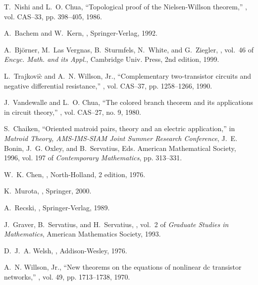 \documentclass{article}
\begin{document}
\begin{thebibliography}{10}
T.~Nishi and L.~O. Chua,
\newblock ``Topological proof of the {N}ielsen-{W}illson theorem,''
, vol. CAS--33, pp. 398--405, 1986.

A.~Bachem and W.~Kern,
,
\newblock Springer-Verlag, 1992.

A.~Bj\"{o}rner, M.~Las Vergnas, B.~Sturmfels, N.~White, and G.~Ziegler,
, vol.~46 of {\em Encyc. Math. and its Appl.},
\newblock Cambridge Univ. Press, 2nd edition, 1999.

L.~Trajkovi\`{c} and A.~N. {Willson, Jr.},
\newblock ``Complementary two-transistor circuits and negative differential
  resistance,''
, vol. CAS--37, pp. 1258--1266, 1990.

J.~Vandewalle and L.~O. Chua,
\newblock ``The colored branch theorem and its applications in circuit
  theory,''
, vol. CAS--27, no. 9, 1980.

S.~Chaiken,
\newblock ``Oriented matroid pairs, theory and an electric application,''
\newblock in {\em Matroid Theory, AMS-IMS-SIAM Joint Summer Research
  Conference}, J.~E. Bonin, J.~G. Oxley, and B.~Servatius, Eds. American
  Mathematical Society, 1996, vol. 197 of {\em Contemporary Mathematics}, pp.
  313--331.

W.~K. Chen,
,
\newblock North-Holland, 2 edition, 1976.

K.~Murota,
,
\newblock Springer, 2000.

A.~Recski,
,
\newblock Springer-Verlag, 1989.

J.~Graver, B.~Servatius, and H.~Servatius,
, vol.~2 of {\em Graduate Studies in
  Mathematics},
\newblock American Mathematics Society, 1993.

D.~J.~A. Welsh,
,
\newblock Addison-Wesley, 1976.

A.~N. {Willson, Jr.},
\newblock ``New theorems on the equations of nonlinear dc transistor
  networks,''
, vol. 49, pp. 1713--1738, 1970.

\end{thebibliography}
\end{document}
